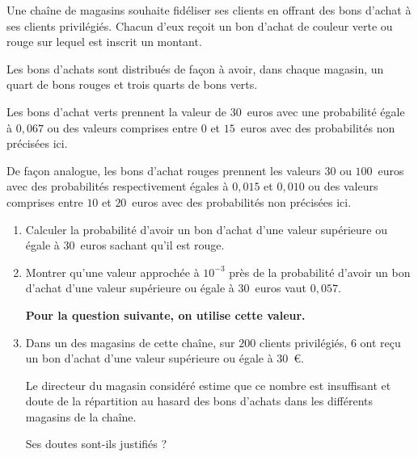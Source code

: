 \documentclass[12pt,french]{article}
\begin{document}
\begin{question}[subtitle={Métropole 2015}]
\medskip

Une chaîne de magasins souhaite fidéliser ses clients en offrant des bons
d'achat à ses clients privilégiés. Chacun d'eux reçoit un bon d'achat de
couleur verte ou rouge sur lequel est inscrit un montant.

Les bons d'achats sont distribués de façon à avoir, dans chaque magasin, un
quart de bons rouges et trois quarts de bons verts.

Les bons d'achat verts prennent la valeur de $30$~euros avec une probabilité
égale à $0,067$ ou des valeurs comprises entre $0$ et $15$~euros avec des
probabilités non précisées ici.

De façon analogue, les bons d'achat rouges prennent les valeurs $30$ ou
$100$~euros avec des probabilités respectivement égales à $0,015$ et $0,010$
ou des valeurs comprises entre $10$ et $20$~euros avec des probabilités non
précisées ici.

\medskip

\begin{enumerate}
  \item Calculer la probabilité d'avoir un bon d'achat d'une valeur
    supérieure ou égale à $30$~euros sachant qu'il est rouge.
  \item Montrer qu'une valeur approchée à $10^{-3}$ près de la probabilité
    d'avoir un bon d'achat d'une valeur supérieure ou égale à $30$~euros
    vaut $0,057$.

    \textbf{Pour la question suivante, on utilise cette valeur.}

  \item Dans un des magasins de cette chaîne, sur $200$ clients privilégiés, $6$ ont reçu un bon d'achat d'une valeur supérieure ou égale à $30$~\euro.

    \smallskip

    Le directeur du magasin considéré estime que ce nombre est insuffisant
    et doute de la répartition au hasard des bons d'achats dans les
    différents magasins de la chaîne.

    Ses doutes sont-ils justifiés ?
\end{enumerate}

\end{question}
\end{document}
